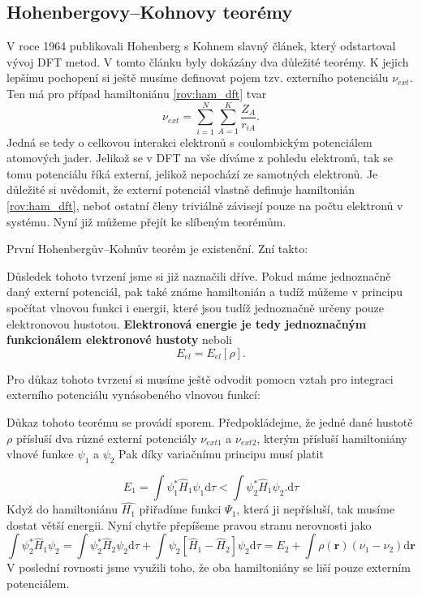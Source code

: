 \subsection{Hohenbergovy--Kohnovy teorémy}

V roce 1964 publikovali Hohenberg s Kohnem slavný článek, který odstartoval vývoj DFT metod.
V tomto článku byly dokázány dva důležité teorémy. K jejich lepšímu pochopení si ještě musíme definovat pojem tzv. externího potenciálu $\nu_{ext}$. Ten má pro případ hamiltoniánu \eqref{rov:ham_dft} tvar
\begin{equation}
\nu_{ext} = \sum_{i=1}^N\sum_{A=1}^K \frac{Z_A}{r_{iA}} .
\end{equation} 
Jedná se tedy o celkovou interakci elektronů s coulombickým potenciálem atomových jader. Jelikož se v DFT na vše díváme z pohledu elektronů, tak se tomu potenciálu říká externí, jelikož nepochází ze samotných elektronů. Je důležité si uvědomit, že externí potenciál vlastně definuje hamiltonián \ref{rov:ham_dft}, neboť ostatní členy triviálně závisejí pouze na počtu elektronů v systému. Nyní již můžeme přejít ke slíbeným teorémům.

První Hohenbergův--Kohnův teorém je existenční. Zní takto:

Důsledek tohoto tvrzení jsme si již naznačili dříve. Pokud máme jednoznačně daný externí potenciál, pak také známe hamiltonián a tudíž můžeme v principu spočítat vlnovou funkci i energii, které jsou tudíž jednoznačně určeny pouze elektronovou hustotou. \textbf{Elektronová energie je tedy jednoznačným funkcionálem elektronové hustoty} neboli
\begin{equation}
E_{el}=E_{el}[\rho] .
\end{equation}

Pro důkaz tohoto tvrzení si musíme ještě odvodit pomocn vztah pro integraci externího potenciálu vynásobeného vlnovou funkcí:

Důkaz tohoto teorému se provádí sporem. Předpokládejme, že jedné dané hustotě $\rho$ přísluší dva různé externí potenciály $\nu_{ext1}$ a $\nu_{ext2}$, kterým přísluší hamiltoniány vlnové funkce $\psi_1$ a $\psi_2$  Pak díky variačnímu principu musí platit

\begin{equation}
E_1 = \int \psi_1^* \hat{H}_1 \psi_1 \mathrm{d}\tau < \int \psi_2^* \hat{H}_1 \psi_2 . \mathrm{d}\tau
\end{equation}
Když do hamiltoniánu $\hat{H_1}$ přiřadíme funkci $\Psi_1$, která ji nepřísluší, tak musíme dostat větší energii. Nyní chytře přepíšeme pravou stranu nerovnosti jako  
\begin{equation}
\int \psi_2^* \hat{H}_1 \psi_2 = \int \psi_2^* \hat{H}_2 \psi_2\mathrm{d}\tau  + \int \psi_2 \left[\hat{H}_1-\hat{H}_2\right] \psi_2\mathrm{d}\tau = E_2 + \int \rho(\mathbf{r})(\nu_1-\nu_2)\mathrm{d}\mathbf{r}  
\end{equation}
V poslední rovnosti jsme využili toho, že oba hamiltoniány se liší pouze externím potenciálem.

